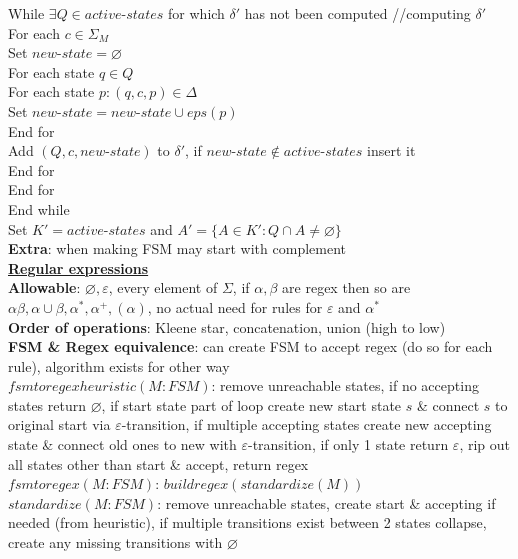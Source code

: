 \documentclass[a4paper]{article}
\begin{document}
\begin{multicols}{2}
        While $\exists Q \in active\mbox{-}states$ for which $\delta'$ has not been computed //computing $\delta'$\\
        For each $c \in \Sigma_M$\\
        Set $new\mbox{-}state = \varnothing$\\
        For each state $q \in Q$\\
        For each state $p : (q, c, p) \in \Delta$\\
        Set $new\mbox{-}state = new\mbox{-}state \cup eps(p)$\\
        End for\\
        Add $(Q, c, new\mbox{-}state)$ to $\delta'$, if $new\mbox{-}state \notin active\mbox{-}states$ insert it\\
        End for\\
        End for\\
        End while\\
        Set $K' = active\mbox{-}states$ and $A' = \{ A \in K' : Q \cap A \neq \varnothing \}$\\
        \textbf{Extra}: when making FSM may start with complement\\
        \underline{\textbf{Regular expressions}}\\
        \textbf{Allowable}: $\varnothing, \varepsilon$, every element of $\Sigma$, if $\alpha, \beta$ are regex then so are $\alpha\beta, \alpha\cup\beta, \alpha^*, \alpha^+, (\alpha)$, no actual need for rules for $\varepsilon$ and $\alpha^*$\\
        \textbf{Order of operations}: Kleene star, concatenation, union (high to low)\\
        \textbf{FSM \& Regex equivalence}: can create FSM to accept regex (do so for each rule), algorithm exists for other way\\
        \boldmath$fsmtoregexheuristic(M: FSM)$\unboldmath: remove unreachable states, if no accepting states return $\varnothing$, if start state part of loop create new start state $s$ \& connect $s$ to original start via $\varepsilon$-transition, if multiple accepting states create new accepting state \& connect old ones to new with $\varepsilon$-transition, if only 1 state return $\varepsilon$, rip out all states other than start \& accept, return regex\\
        \boldmath$fsmtoregex(M: FSM)$\unboldmath: $buildregex(standardize(M))$\\
        \boldmath$standardize(M: FSM)$\unboldmath: remove unreachable states, create start \& accepting if needed (from heuristic), if multiple transitions exist between 2 states collapse, create any missing transitions with $\varnothing$\\

\end{multicols}
\end{document}

